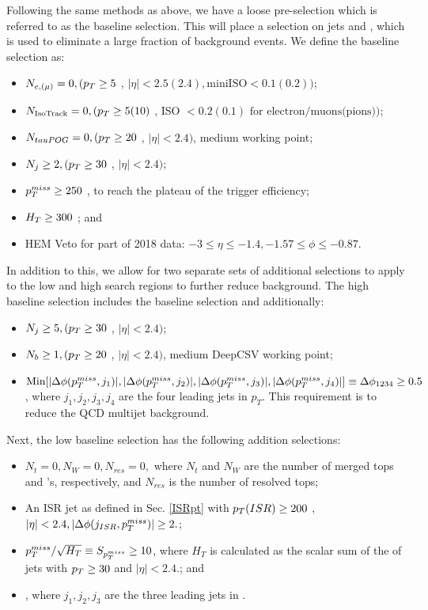 Following the same methods as above, we have a loose pre-selection which is referred to as the baseline selection. This will place a selection on jets and \met, which is used to eliminate a large fraction of background events. We define the baseline selection as:
\begin{itemize}
	\item $N_{e,(\mu)} = 0, (p_{T}\geq5$ \GeV, $|\eta|<2.5(2.4), \text{miniISO}<0.1(0.2))$;
	\item $N_{\text{IsoTrack}} = 0, (p_{T}\geq5 (10)$ \GeV, ISO $< 0.2(0.1) \text{ for electron/muons(pions)})$;
	\item $N_{tauPOG} = 0, (p_{T}\geq20$ \GeV, $|\eta|<2.4)$, medium working point;
	\item $N_{j} \geq 2, (p_{T}\geq30$ \GeV, $|\eta|<2.4)$;
	\item $p_{T}^{miss}\geq250$ \GeV, to reach the plateau of the trigger efficiency;
	\item $H_{T}\geq300$ \GeV; and
	\item HEM Veto for part of 2018 data: $-3\leq\eta\leq-1.4, -1.57\leq\phi\leq-0.87$.
\end{itemize}
In addition to this, we allow for two separate sets of additional selections to apply to the low and high \dm{} search regions to further reduce background. The high \dm{} baseline selection includes the baseline selection and additionally:
\begin{itemize}
	\item $N_j\geq 5, (p_{T} \geq30$ \GeV, $|\eta|<2.4)$;
	\item $N_b\geq 1, (p_{T}\geq20$ \GeV, $|\eta|<2.4)$, medium DeepCSV working point;
	\item $\text{Min}[|\Delta\phi(p_{T}^{miss},j_1)|,|\Delta\phi(p_{T}^{miss},j_2)|,|\Delta\phi(p_{T}^{miss},j_3)|,|\Delta\phi(p_{T}^{miss},j_4)|]\equiv\Delta\phi_{1234}\geq0.5$, where $j_1, j_2, j_3, j_4$ are the four leading jets in $p_T$. This requirement is to reduce the QCD multijet background. 
\end{itemize}
Next, the low \dm{} baseline selection has the following addition selections:
\begin{itemize}
	\item $N_t=0, N_W=0,N_{res}=0,$ where $N_t$ and $N_W$ are the number of merged tops and \W's, respectively, and $N_{res}$ is the number of resolved tops;
	\item An ISR jet as defined in Sec. \ref{ISRpt} with $p_{T}(ISR)\geq200$ \GeV, $|\eta|<2.4, |\Delta\phi(j_{ISR},p_{T}^{miss})|\geq2.$;
	\item $p_{T}^{miss}/\sqrt{H_{T}}\equiv S_{p_{T}^{miss}}\geq10$, where $H_T$ is calculated as the scalar sum of the \pt of jets with $p_{T}\geq30$ \GeV{} and $|\eta|<2.4.$; and
	\item \lowdm, where $j_1,j_2,j_3$ are the three leading jets in \pt. 
\end{itemize}

